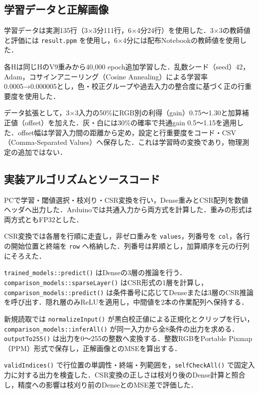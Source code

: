 \documentclass[
  10pt,
  a4paper,
]{article}
\begin{document}
\subsection{学習データと正解画像}\label{ux5b66ux7fd2ux30c7ux30fcux30bfux3068ux6b63ux89e3ux753bux50cf}

学習データは実測135行（3×3分111行，6×4分24行）を使用した．3×3の教師値と評価には
\texttt{result.ppm} を使用し，6×4分には配布Notebookの教師値を使用した．

各Hは同じHのV9重みから40,000
epoch追加学習した．乱数シード（seed）42，Adam，コサインアニーリング（Cosine
Annealing）による学習率0.0005→0.000005とし，色・校正グループや過去入力の整合度に基づく正の行重要度を使用した．

データ拡張として，3×3入力の50\%にRGB別の利得（gain）0.75〜1.30と加算補正値（offset）を加えた．灰・白には30\%の確率で共通gain
0.5〜1.15を適用した．offset幅は学習入力間の距離から定め，設定と行重要度をコード・CSV（Comma-Separated
Values）へ保存した．これは学習時の変換であり，物理測定の追加ではない．

\subsection{実装アルゴリズムとソースコード}\label{ux5b9fux88c5ux30a2ux30ebux30b4ux30eaux30baux30e0ux3068ux30bdux30fcux30b9ux30b3ux30fcux30c9}

PCで学習・閾値選択・枝刈り・CSR変換を行い，Dense重みとCSR配列を数値ヘッダへ出力した．Arduinoでは共通入力から両方式を計算した．重みの形式は両方式ともFP32とした．

CSR変換では各層を行順に走査し，非ゼロ重みを \texttt{values}，列番号を
\texttt{col}，各行の開始位置と終端を \texttt{row}
へ格納した．列番号は昇順とし，加算順序を元の行列にそろえた．

\texttt{trained\_models::predict()}
はDenseの3層の推論を行う．\texttt{comparison\_models::sparseLayer()}
はCSR形式の1層を計算し，\texttt{comparison\_models::predict()}
は条件番号に応じてDenseまたは3層のCSR推論を呼び出す．隠れ層のみReLUを適用し，中間値を2本の作業配列へ保持する．

新規読取では \texttt{normalizeInput()}
が黒白校正値による正規化とクリップを行い，\texttt{comparison\_models::inferAll()}
が同一入力から全8条件の出力を求める．\texttt{outputTo255()}
は出力を0〜255の整数へ変換する．整数RGBをPortable
Pixmap（PPM）形式で保存し，正解画像とのMSEを算出する．

\texttt{validIndices()}
で行位置の単調性・終端・列範囲を，\texttt{selfCheckAll()}
で固定入力に対する出力を検査した．CSR変換の正しさは枝刈り後のDense計算と照合し，精度への影響は枝刈り前のDenseとのMSE差で評価した．
\end{document}
